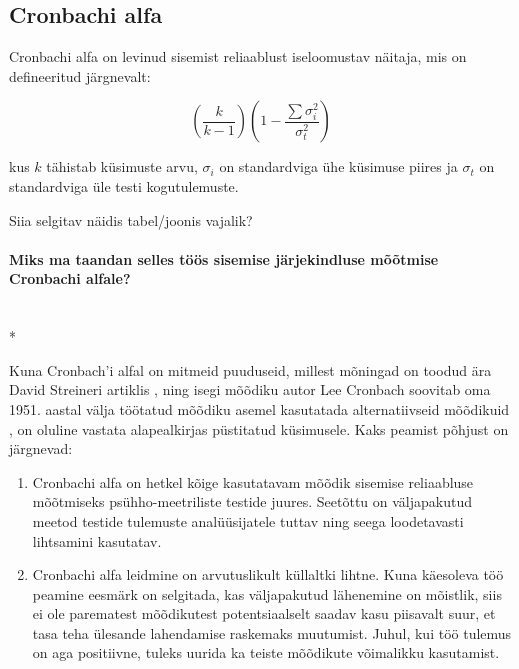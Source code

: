 \documentclass[a4paper,12pt]{article}
\numberwithin{equation}{section}
\theoremstyle{definition}
\begin{document}
\subsection{Cronbachi alfa}

Cronbachi alfa on levinud sisemist reliaablust iseloomustav näitaja, mis on defineeritud järgnevalt:

\begin{equation}
(\frac{k}{k-1})( 1 - \frac{\sum \sigma_i^2}{\sigma_t^2})
\end{equation}

kus $k$ tähistab k\"usimuste arvu, $\sigma_i$ on standardviga \"uhe k\"usimuse piires ja $\sigma_t$ on standardviga \"ule testi kogutulemuste.\cite[396]{Cronbach2004}

{\color{cyan} Siia selgitav näidis tabel/joonis vajalik?}


\paragraph{Miks ma taandan selles töös sisemise järjekindluse mõõtmise Cronbachi alfale?}\mbox{}\\*

Kuna Cronbach'i alfal on mitmeid puuduseid, millest mõningad on toodud ära David Streineri artiklis \cite[101-102]{Streiner2010}, ning isegi mõõdiku autor Lee Cronbach soovitab oma 1951. aastal välja töötatud mõõdiku asemel kasutatada alternatiivseid mõõdikuid \cite{Cronbach2004}, on oluline vastata alapealkirjas p\"ustitatud k\"usimusele. Kaks peamist põhjust on järgnevad:
\begin{enumerate}[I]
\item Cronbachi alfa on hetkel kõige kasutatavam mõõdik sisemise reliaabluse mõõtmiseks ps\"uhho-meetriliste testide juures. Seetõttu on väljapakutud meetod testide tulemuste anal\"u\"usijatele tuttav ning seega loodetavasti lihtsamini kasutatav.
\item Cronbachi alfa leidmine on arvutuslikult k\"ullaltki lihtne. Kuna käesoleva töö peamine eesmärk on selgitada, kas väljapakutud lähenemine on mõistlik, siis ei ole parematest mõõdikutest potentsiaalselt saadav kasu piisavalt suur, et tasa teha \"ulesande lahendamise raskemaks muutumist. Juhul, kui töö tulemus on aga positiivne,  tuleks uurida ka teiste mõõdikute võimalikku kasutamist.

\end{enumerate}
\end{document}
